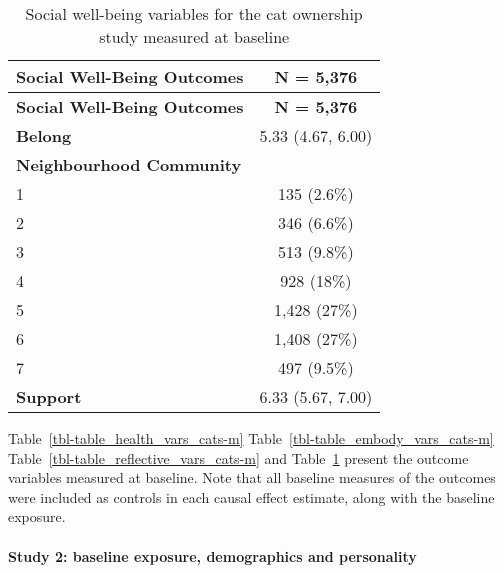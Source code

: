 \documentclass[
  singlecolumn,
  9pt]{article}
\let\oldparagraph\paragraph
\renewcommand{\paragraph}[1]{\oldparagraph{#1}\mbox{}}
\begin{document}
\begin{longtable}[]{@{}lc@{}}
\caption{Social well-being variables for the cat ownership study
measured at baseline}\label{tbl-table_social_vars_cats-m}\tabularnewline
\toprule\noalign{}
\textbf{Social Well-Being Outcomes} & \textbf{N = 5,376} \\
\midrule\noalign{}
\endfirsthead
\toprule\noalign{}
\textbf{Social Well-Being Outcomes} & \textbf{N = 5,376} \\
\midrule\noalign{}
\endhead
\bottomrule\noalign{}
\endlastfoot
\textbf{Belong} & 5.33 (4.67, 6.00) \\
\textbf{Neighbourhood Community} & \\
1 & 135 (2.6\%) \\
2 & 346 (6.6\%) \\
3 & 513 (9.8\%) \\
4 & 928 (18\%) \\
5 & 1,428 (27\%) \\
6 & 1,408 (27\%) \\
7 & 497 (9.5\%) \\
\textbf{Support} & 6.33 (5.67, 7.00) \\
\end{longtable}

Table~\ref{tbl-table_health_vars_cats-m}
Table~\ref{tbl-table_embody_vars_cats-m}
Table~\ref{tbl-table_reflective_vars_cats-m} and
Table~\ref{tbl-table_social_vars_cats-m} present the outcome variables
measured at baseline. Note that all baseline measures of the outcomes
were included as controls in each causal effect estimate, along with the
baseline exposure.

\newpage{}

\paragraph{Study 2: baseline exposure, demographics and
personality}\label{study-2-baseline-exposure-demographics-and-personality}
\end{document}
